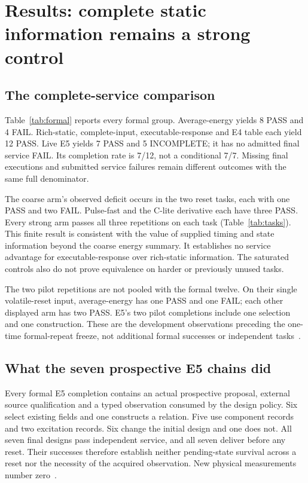 \section{Results: complete static information remains a strong control}
\subsection{The complete-service comparison}
Table~\ref{tab:formal} reports every formal group. Average-energy yields
8 PASS and 4 FAIL. Rich-static, complete-input, executable-response and
E4 table each yield 12 PASS. Live E5 yields 7 PASS and 5 INCOMPLETE;
it has no admitted final service FAIL. Its completion rate is 7/12,
not a conditional 7/7. Missing final executions and submitted service
failures remain different outcomes with the same full denominator.




The coarse arm's observed deficit occurs in the two reset tasks, each
with one PASS and two FAIL. Pulse-fast and the C-lite derivative each
have three PASS. Every strong arm passes all three repetitions on each
task (Table~\ref{tab:tasks}). This finite result is consistent with the
value of supplied timing and state information beyond the coarse energy
summary. It establishes no service advantage for executable-response
over rich-static information. The saturated controls also do not prove
equivalence on harder or previously unused tasks.

The two pilot repetitions are not pooled with the formal twelve. On
their single volatile-reset input, average-energy has one PASS and one
FAIL; each other displayed arm has two PASS. E5's two pilot completions
include one selection and one construction. These are the development
observations preceding the one-time formal-repeat freeze, not additional
formal successes or independent tasks~\cite{tables,protocol}.

\subsection{What the seven prospective E5 chains did}
Every formal E5 completion contains an actual prospective proposal,
external source qualification and a typed observation consumed by the
design policy. Six select existing fields and one constructs a relation.
Five use component records and two excitation records. Six change the
initial design and one does not. All seven final designs pass independent
service, and all seven deliver before any reset. Their successes therefore
establish neither pending-state survival across a reset nor the necessity
of the acquired observation. New physical measurements number
zero~\cite{tables,comparison}.

